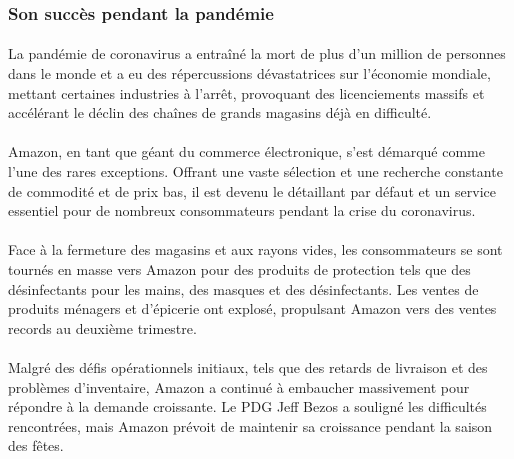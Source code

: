 \subsubsection{Son succès pendant la pandémie}
\paragraph{}
\vspace{-2em}  %
La pandémie de coronavirus a entraîné la mort de plus d'un million de personnes dans le monde et a eu des répercussions dévastatrices sur l'économie mondiale, mettant certaines industries à l'arrêt, provoquant des licenciements massifs et accélérant le déclin des chaînes de grands magasins déjà en difficulté.
\paragraph{}
\vspace{-2em}  %
Amazon, en tant que géant du commerce électronique, s'est démarqué comme l'une des rares exceptions. Offrant une vaste sélection et une recherche constante de commodité et de prix bas, il est devenu le détaillant par défaut et un service essentiel pour de nombreux consommateurs pendant la crise du coronavirus.

\paragraph{}
\vspace{-2em}  %
Face à la fermeture des magasins et aux rayons vides, les consommateurs se sont tournés en masse vers Amazon pour des produits de protection tels que des désinfectants pour les mains, des masques et des désinfectants. Les ventes de produits ménagers et d'épicerie ont explosé, propulsant Amazon vers des ventes records au deuxième trimestre.

\paragraph{}
\vspace{-2em}  %
Malgré des défis opérationnels initiaux, tels que des retards de livraison et des problèmes d'inventaire, Amazon a continué à embaucher massivement pour répondre à la demande croissante. Le PDG Jeff Bezos a souligné les difficultés rencontrées, mais Amazon prévoit de maintenir sa croissance pendant la saison des fêtes.

